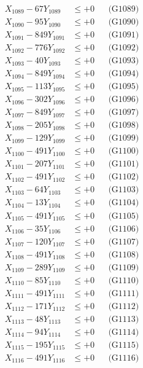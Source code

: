 \documentclass[a4paper,10pt]{article}
\begin{document}
{\begin{align}
X_{1089} - 67Y_{1089} &\leq +0 && \text{(G1089)} \\
X_{1090} - 95Y_{1090} &\leq +0 && \text{(G1090)} \\
\allowbreak
X_{1091} - 849Y_{1091} &\leq +0 && \text{(G1091)} \\
X_{1092} - 776Y_{1092} &\leq +0 && \text{(G1092)} \\
X_{1093} - 40Y_{1093} &\leq +0 && \text{(G1093)} \\
X_{1094} - 849Y_{1094} &\leq +0 && \text{(G1094)} \\
X_{1095} - 113Y_{1095} &\leq +0 && \text{(G1095)} \\
X_{1096} - 302Y_{1096} &\leq +0 && \text{(G1096)} \\
X_{1097} - 849Y_{1097} &\leq +0 && \text{(G1097)} \\
X_{1098} - 205Y_{1098} &\leq +0 && \text{(G1098)} \\
X_{1099} - 129Y_{1099} &\leq +0 && \text{(G1099)} \\
X_{1100} - 491Y_{1100} &\leq +0 && \text{(G1100)} \\
\allowbreak
X_{1101} - 207Y_{1101} &\leq +0 && \text{(G1101)} \\
X_{1102} - 491Y_{1102} &\leq +0 && \text{(G1102)} \\
X_{1103} - 64Y_{1103} &\leq +0 && \text{(G1103)} \\
X_{1104} - 13Y_{1104} &\leq +0 && \text{(G1104)} \\
X_{1105} - 491Y_{1105} &\leq +0 && \text{(G1105)} \\
X_{1106} - 35Y_{1106} &\leq +0 && \text{(G1106)} \\
X_{1107} - 120Y_{1107} &\leq +0 && \text{(G1107)} \\
X_{1108} - 491Y_{1108} &\leq +0 && \text{(G1108)} \\
X_{1109} - 289Y_{1109} &\leq +0 && \text{(G1109)} \\
X_{1110} - 85Y_{1110} &\leq +0 && \text{(G1110)} \\
\allowbreak
X_{1111} - 491Y_{1111} &\leq +0 && \text{(G1111)} \\
X_{1112} - 171Y_{1112} &\leq +0 && \text{(G1112)} \\
X_{1113} - 48Y_{1113} &\leq +0 && \text{(G1113)} \\
X_{1114} - 94Y_{1114} &\leq +0 && \text{(G1114)} \\
X_{1115} - 195Y_{1115} &\leq +0 && \text{(G1115)} \\
X_{1116} - 491Y_{1116} &\leq +0 && \text{(G1116)} \\

\end{align}}
\end{document}
